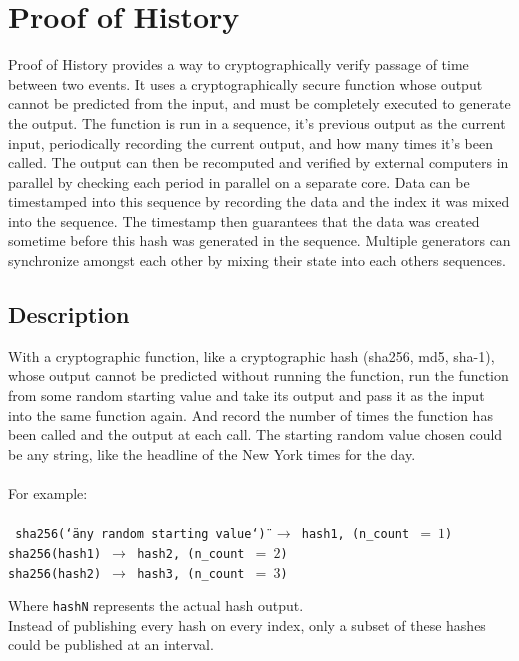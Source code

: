 \documentclass[12pt]{article}
\begin{document}
\section{Proof of History}\label{proof_of_history}

Proof of History provides a way to cryptographically verify passage of time between two events. It uses a cryptographically secure function whose output cannot be predicted from the input, and must be completely executed to generate the output. The function is run in a sequence, it’s previous output as the current input, periodically recording the current output, and how many times it’s been called. The output can then be recomputed and verified by external computers in parallel by checking each period in parallel on a separate core. Data can be timestamped into this sequence by recording the data and the index it was mixed into the sequence. The timestamp then guarantees that the data was created sometime before this hash was generated in the sequence. Multiple generators can synchronize amongst each other by mixing their state into each others sequences. \\

\subsection{Description}
With a cryptographic function, like a cryptographic hash (sha256, md5, sha-1), whose output cannot be predicted without running the function, run the function from some random starting value and take its output and pass it as the input into the same function again.  And record the number of times the function has been called and the output at each call.  The starting random value chosen could be any string, like the headline of the New York times for the day.
\\\\
\noindent For example: \\\\\noindent
\texttt{
  sha256(\char`\"any random starting value\char`\") $\rightarrow$
  hash1, (n\_count~$=~1$) \\
  sha256(hash1) $\rightarrow$ hash2, (n\_count~$=~2$)\\
  sha256(hash2) $\rightarrow$ hash3, (n\_count~$=~3$)\\
}

\noindent Where \texttt{hashN} represents the actual hash output. \\

Instead of publishing every hash on every index, only a subset of
these hashes could be published at an interval.\\
\end{document}
